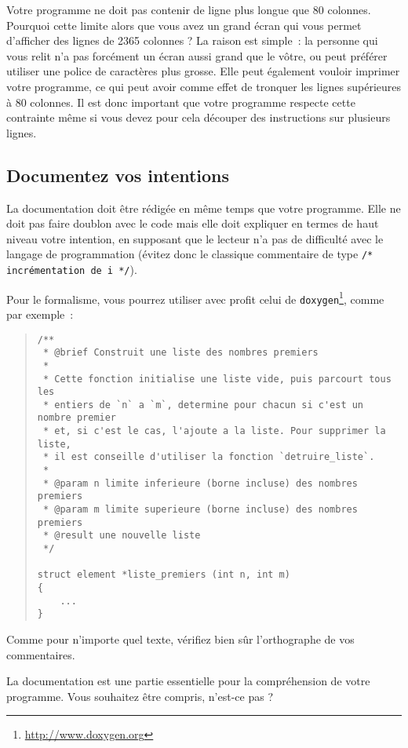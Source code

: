 \documentclass {article}
\begin{document}
Votre programme ne doit pas contenir de ligne plus longue que 80 colonnes.
Pourquoi cette limite alors que vous avez un grand écran qui vous permet
d'afficher des lignes de 2365 colonnes ? La raison est simple~:
la personne qui vous relit n'a pas forcément un écran aussi grand que le
vôtre, ou peut préférer utiliser une police de caractères plus grosse.
Elle peut également vouloir imprimer votre programme, ce qui peut avoir
comme effet de tronquer les lignes supérieures à 80 colonnes.  Il est
donc important que votre programme respecte cette contrainte même si
vous devez pour cela découper des instructions sur plusieurs lignes.


\subsection {Documentez vos intentions}

La documentation doit être rédigée en même temps que votre programme.
Elle ne doit pas faire doublon avec le code mais elle doit expliquer
en termes de haut niveau votre intention, en supposant que le lecteur
n'a pas de difficulté avec le langage de programmation (évitez donc
le classique commentaire de type \verb|/* incrémentation de i */|).

Pour le formalisme, vous pourrez utiliser avec profit celui de \texttt
{doxygen}\footnote {\url {http://www.doxygen.org}}, comme par exemple~:

\begin {quote}
\footnotesize
\begin {lstlisting}
/**
 * @brief Construit une liste des nombres premiers
 *
 * Cette fonction initialise une liste vide, puis parcourt tous les
 * entiers de `n` a `m`, determine pour chacun si c'est un nombre premier
 * et, si c'est le cas, l'ajoute a la liste. Pour supprimer la liste,
 * il est conseille d'utiliser la fonction `detruire_liste`.
 *
 * @param n limite inferieure (borne incluse) des nombres premiers
 * @param m limite superieure (borne incluse) des nombres premiers
 * @result une nouvelle liste
 */

struct element *liste_premiers (int n, int m)
{
    ...
}
\end{lstlisting}
\end {quote}

Comme pour n'importe quel texte, vérifiez bien sûr l'orthographe de
vos commentaires.

La documentation est une partie essentielle pour la compréhension de
votre programme. Vous souhaitez être compris, n'est-ce pas ?
\end{document}
